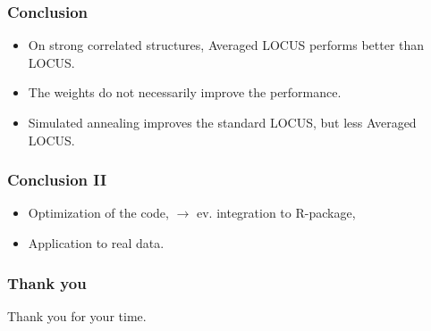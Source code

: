 \documentclass{beamer}
\begin{document}
\begin{frame}
\frametitle{Conclusion}
\begin{itemize}
\item On strong correlated structures, Averaged LOCUS performs better than LOCUS.
\item The weights do not necessarily improve the performance.
\item Simulated annealing improves the standard LOCUS, but less Averaged LOCUS.
\end{itemize}
\end{frame}

\begin{frame}
\frametitle{Conclusion II}
\begin{itemize}
\item Optimization of the code, $\rightarrow$ ev. integration to R-package,
\item Application to real data.

\end{itemize}
\end{frame}

\begin{frame}
\frametitle{Thank you}
Thank you for your time.
\end{frame}
\end{document}
